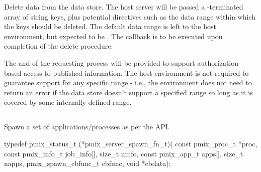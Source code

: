 
\optattrend

\descr

Delete data from the data store.
The host server will be passed a -terminated array of string keys, plus potential directives such as the data range within which the keys should be deleted. The default data range is left to the host environment, but expected to be .
The callback is to be executed upon completion of the delete procedure.

\advicermstart
The  and  of the requesting process will be provided to support authorization-based access to published information. The host environment is not required to guarantee support for any specific range - i.e., the environment does not need to return an error if the data store doesn't support a specified range so long as it is covered by some internally defined range.
\advicermend


\subsection{}

\summary

Spawn a set of applications/processes as per the  API.

\format

\cspecificstart
\begin{codepar}
typedef pmix_status_t (*pmix_server_spawn_fn_t)(
                             const pmix_proc_t *proc,
                             const pmix_info_t job_info[],
                             size_t ninfo,
                             const pmix_app_t apps[],
                             size_t napps,
                             pmix_spawn_cbfunc_t cbfunc,
                             void *cbdata);
\end{codepar}
\cspecificend

\begin{arglist}
\end{arglist}

